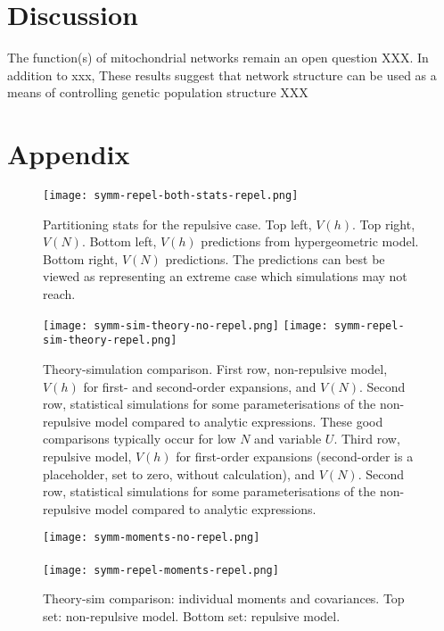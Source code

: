 \documentclass{article}
\begin{document}
\section*{Discussion} 
The function(s) of mitochondrial networks remain an open question XXX. In addition to xxx, These results suggest that network structure can be used as a means of controlling genetic population structure XXX

\newpage
\clearpage

\section*{Appendix}

\begin{figure}
  \texttt{[image: symm-repel-both-stats-repel.png]}
  \caption{Partitioning stats for the repulsive case. Top left, $V(h)$. Top right, $V(N)$. Bottom left, $V(h)$ predictions from hypergeometric model. Bottom right, $V(N)$ predictions. The predictions can best be viewed as representing an extreme case which simulations may not reach.}
  \label{fig-repel-map}
\end{figure}

\begin{figure}
  \texttt{[image: symm-sim-theory-no-repel.png]}
  \texttt{[image: symm-repel-sim-theory-repel.png]}
  \caption{Theory-simulation comparison. First row, non-repulsive model, $V(h)$ for first- and second-order expansions, and $V(N)$. Second row, statistical simulations for some parameterisations of the non-repulsive model compared to analytic expressions. These good comparisons typically occur for low $N$ and variable $U$. Third row, repulsive model, $V(h)$ for first-order expansions (second-order is a placeholder, set to zero, without calculation), and $V(N)$. Second row, statistical simulations for some parameterisations of the non-repulsive model compared to analytic expressions. }
  \label{fig-both-sim}
\end{figure}

\begin{figure}
  \texttt{[image: symm-moments-no-repel.png]} \\ \\
  \texttt{[image: symm-repel-moments-repel.png]}
  \caption{Theory-sim comparison: individual moments and covariances. Top set: non-repulsive model. Bottom set: repulsive model.}
  \label{fig-both-moments}
\end{figure}
\end{document}
